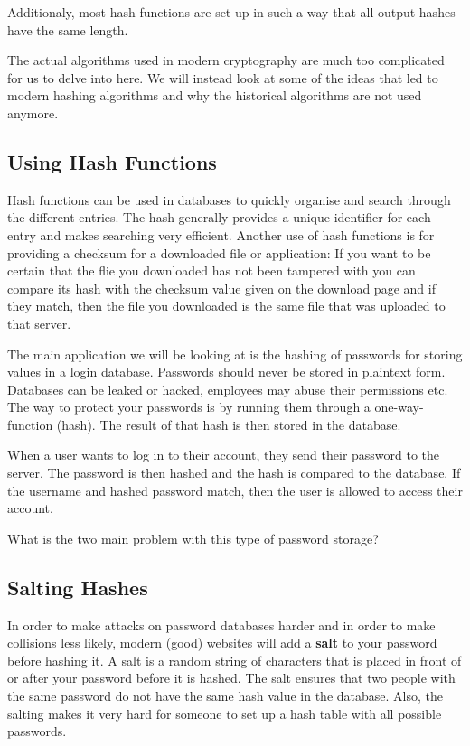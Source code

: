 \documentclass[11pt,a4paper]{report}
\begin{document}
Additionaly, most hash functions are set up in such a way that all output hashes have the same length.


The actual algorithms used in modern cryptography are much too complicated for us to delve into here. We will instead look at some of the ideas that led to modern hashing algorithms and why the historical algorithms are not used anymore.

\subsection{Using Hash Functions}

Hash functions can be used in databases to quickly organise and search through the different entries. The hash generally provides a unique identifier for each entry and makes searching very efficient. Another use of hash functions is for providing a checksum for a downloaded file or application: If you want to be certain that the flie you downloaded has not been tampered with you can compare its hash with the checksum value given on the download page and if they match, then the file you downloaded is the same file that was uploaded to that server.

The main application we will be looking at is the hashing of passwords for storing values in a login database. Passwords should never be stored in plaintext form. Databases can be leaked or hacked, employees may abuse their permissions etc. The way to protect your passwords is by running them through a one-way-function (hash). The result of that hash is then stored in the database.

When a user wants to log in to their account, they send their password to the server. The password is then hashed and the hash is compared to the database. If the username and hashed password match, then the user is allowed to access their account.

\begin{ex}
What is the two main problem with this type of password storage?
\end{ex}

\subsection{Salting Hashes}

In order to make attacks on password databases harder and in order to make collisions less likely, modern (good) websites will add a \textbf{salt} to your password before hashing it. A salt is a random string of characters that is placed in front of or after your password before it is hashed. The salt ensures that two people with the same password do not have the same hash value in the database. Also, the salting makes it very hard for someone to set up a hash table with all possible passwords.
\end{document}
